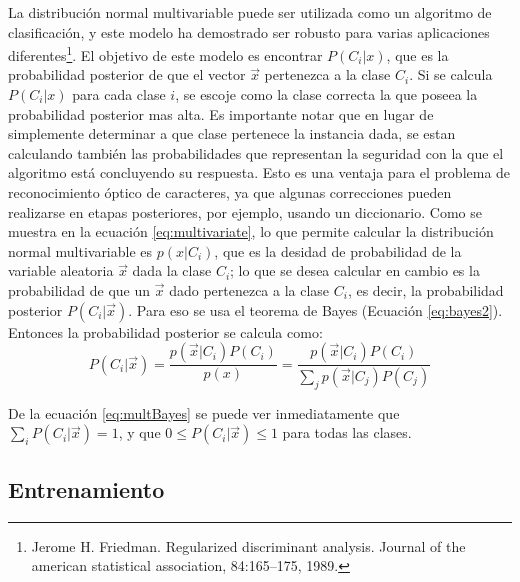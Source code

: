 \documentclass[a4paper, 11pt, oneside]{report}
\begin{document}
La distribución normal multivariable puede ser utilizada como un algoritmo de clasificación, y este modelo ha demostrado ser robusto para varias aplicaciones diferentes\footnote{Jerome H. Friedman. Regularized discriminant analysis. Journal of the american statistical association, 84:165–175, 1989.}.	El objetivo de este modelo es encontrar $P(C_i|x)$, que es la probabilidad posterior de que el vector $\vec{x}$ pertenezca a la clase $C_i$. Si se calcula $P(C_i|x)$ para cada clase $i$, se escoje como la clase correcta la que poseea la probabilidad posterior mas alta. \newline \newline
Es importante notar que en lugar de simplemente determinar a que clase pertenece la instancia dada, se estan calculando también las probabilidades que representan la seguridad con la que el algoritmo está concluyendo su respuesta. Esto es una ventaja para el problema de reconocimiento óptico de caracteres, ya que algunas correcciones pueden realizarse en etapas posteriores, por ejemplo, usando un diccionario. \newline \newline
Como se muestra en la ecuación \eqref{eq:multivariate}, lo que permite calcular la distribución normal multivariable es $p(x|C_i)$, que es la desidad de probabilidad de la variable aleatoria $\vec{x}$ dada la clase $C_i$; lo que se desea calcular en cambio es la probabilidad de que un $\vec{x}$ dado pertenezca a la clase $C_i$, es decir, la probabilidad posterior $P(C_i|\vec{x})$. Para eso se usa el teorema de Bayes (Ecuación \ref{eq:bayes2}). Entonces la probabilidad posterior se calcula como:
	\begin{equation}\label{eq:multBayes}
		P(C_i|\vec{x}) = \frac{p(\vec{x}|C_i)P(C_i)}{p(x)} = \frac{p(\vec{x}|C_i)P(C_i)}{ \sum_j{p(\vec{x}|C_j)P(C_j)} }
	\end{equation}
	
De la ecuación \ref{eq:multBayes} se puede ver inmediatamente que $\sum_i{P(C_i|\vec{x})}=1$, y que $0 \le P(C_i|\vec{x}) \le 1$ para todas las clases.
	
\subsection{Entrenamiento}
\end{document}
